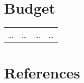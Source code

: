 \documentclass[11pt,article,oneside]{memoir}
\begin{document}
\section{Budget}

\begin{table}[H]
\small
\begin{tabular}{l r @{\hskip 0.1cm} l @{\hskip 0.5cm} l}
%
\ldots & \ldots & \ldots & \ldots \\
%
\end{tabular}
\end{table}



\section{References}
\renewcommand*{\bibfont}{\normalsize} %
\vspace*{0.5cm}
\nocite{*}
\setlength{}
\printbibliography[heading=none]
\end{document}

